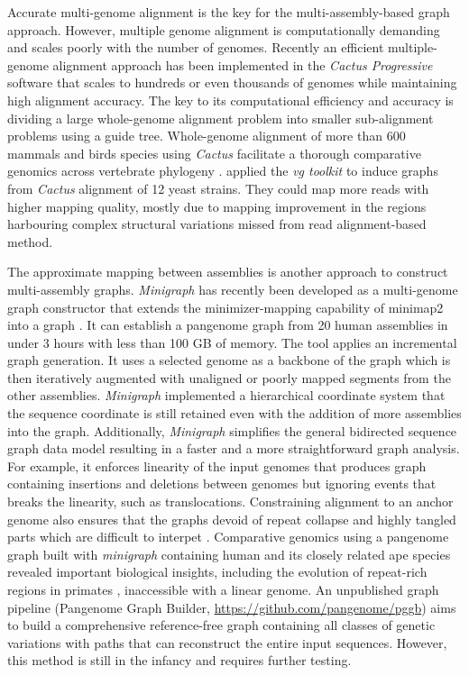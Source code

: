 \documentclass[../main.tex]{subfiles}
\begin{document}
Accurate multi-genome alignment is the key for the multi-assembly-based graph approach. However, multiple genome alignment is computationally demanding and scales poorly with the number of genomes. Recently an efficient multiple-genome alignment approach has been implemented in the \emph{Cactus Progressive} software \citep{armstrong2020progressive} that scales to hundreds or even  thousands of genomes while maintaining high alignment accuracy. The key to its computational efficiency and accuracy is dividing a large whole-genome alignment problem into smaller sub-alignment problems using a guide tree. Whole-genome alignment of more than 600 mammals and birds species using \emph{Cactus} facilitate a thorough comparative genomics across vertebrate phylogeny \citep{feng2020dense,Genereux2020}.
\citet{hickey2020genotyping} applied the \emph{vg toolkit} to induce graphs from \emph{Cactus} alignment of 12 yeast strains. They could map more reads with higher mapping quality, mostly due to mapping improvement in the regions harbouring complex structural variations missed from read alignment-based method. 

The approximate mapping between assemblies is another approach to construct multi-assembly graphs. \emph{Minigraph} \citep{li2020design} has recently been developed as a multi-genome graph constructor that extends the minimizer-mapping capability of minimap2 into a graph \citep{li2018minimap2}. It can establish a pangenome graph from 20 human assemblies in under 3 hours with less than 100 GB of memory. The tool applies an incremental graph generation. It uses  a selected genome as a backbone of the graph which is then iteratively augmented with unaligned or poorly mapped segments from the other assemblies. \emph{Minigraph} implemented a hierarchical coordinate system that the sequence coordinate is still retained even with the addition of more assemblies into the graph. Additionally, \emph{Minigraph} simplifies the general bidirected sequence graph data model resulting in a faster and a more straightforward graph analysis. For example, it enforces linearity of the input genomes that produces graph containing insertions and deletions between genomes but ignoring events that breaks the linearity, such as translocations. Constraining alignment to an anchor genome also ensures that the graphs devoid of repeat collapse and highly tangled parts which are difficult to interpet \citep{Lei2021}. Comparative genomics using a pangenome graph built with \emph{minigraph} containing human and its closely related ape species revealed important biological insights, including the evolution of repeat-rich regions in primates \citep{li2020design}, inaccessible  with a linear genome. An unpublished graph pipeline (Pangenome Graph Builder, \url{https://github.com/pangenome/pggb}) aims to build a comprehensive reference-free graph containing all classes of genetic variations with paths that can reconstruct the entire input sequences. However, this method is still in the infancy and requires further testing. \\
\end{document}
